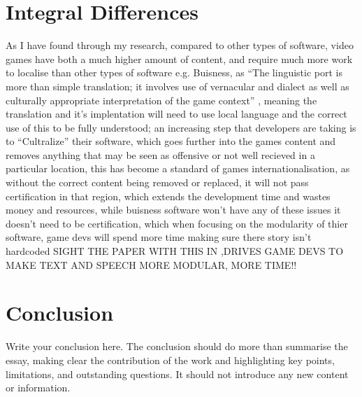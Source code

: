 \documentclass{scrartcl}
\begin{document}
\section{Integral Differences}
As I have found through my research, compared to other types of software, video games have both a much higher amount of content, and require much more work to localise than other types of software e.g. Buisness, as ``The linguistic port is more than simple translation; it involves use of vernacular and dialect as well as culturally appropriate interpretation of the game context'' \cite{losavio2014linguistic}, meaning the translation and it's implentation will need to use local language and the correct use of this to be fully understood; an increasing step that developers are taking is to ``Cultralize'' their software\cite{bestpractices}, which goes further into the games content and removes anything that may be seen as offensive or not well recieved in a particular location, this has become a standard of games internationalisation, as without the correct content being removed or replaced, it will not pass certification in that region, which extends the development time and wastes money and resources, while buisness software won't have any of these issues it doesn't need to be certification, which when focusing on the modularity of thier software, game devs will spend more time making sure there story isn't hardcoded SIGHT THE PAPER WITH THIS IN   ,DRIVES GAME DEVS TO MAKE TEXT AND SPEECH MORE MODULAR, MORE TIME!!



\section{Conclusion}

Write your conclusion here. The conclusion should do more than summarise the essay, making clear the contribution of the work and highlighting key points, limitations, and outstanding questions. It should not introduce any new content or information.



\end{document}
